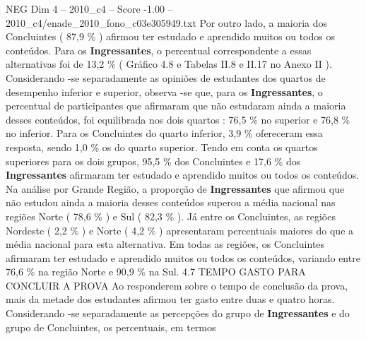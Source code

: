 \begin{textsample}{NEG Dim 4 – 2010\_c4 – Score -1.00 – 2010\_c4/enade\_2010\_fono\_c03e305949.txt}
Por outro lado, a maioria dos Concluintes ( 87,9 \% ) afirmou ter estudado e aprendido muitos ou todos os conteúdos.
Para os \textbf{Ingressantes}, o percentual correspondente a essas alternativas foi de 13,2 \% ( Gráfico 4.8 e Tabelas II.8 e II.17 no Anexo II ).
Considerando -se separadamente as opiniões de estudantes dos quartos de desempenho inferior e superior, observa -se que, para os \textbf{Ingressantes}, o percentual de participantes que afirmaram que não estudaram ainda a maioria desses conteúdos, foi equilibrada nos dois quartos : 76,5 \% no superior e 76,8 \% no inferior.
Para os Concluintes do quarto inferior, 3,9 \% ofereceram essa resposta, sendo 1,0 \% os do quarto superior.
Tendo em conta os quartos superiores para os dois grupos, 95,5 \% dos Concluintes e 17,6 \% dos \textbf{Ingressantes} afirmaram ter estudado e aprendido muitos ou todos os conteúdos.
Na análise por Grande Região, a proporção de \textbf{Ingressantes} que afirmou que não estudou ainda a maioria desses conteúdos superou a média nacional nas regiões Norte ( 78,6 \% ) e Sul ( 82,3 \% ).
Já entre os Concluintes, as regiões Nordeste ( 2,2 \% ) e Norte ( 4,2 \% ) apresentaram percentuais maiores do que a média nacional para esta alternativa.
Em todas as regiões, os Concluintes afirmaram ter estudado e aprendido muitos ou todos os conteúdos, variando entre 76,6 \% na região Norte e 90,9 \% na Sul. 4.7 TEMPO GASTO PARA CONCLUIR A PROVA Ao responderem sobre o tempo de conclusão da prova, mais da metade dos estudantes afirmou ter gasto entre duas e quatro horas.
Considerando -se separadamente as percepções do grupo de \textbf{Ingressantes} e do grupo de Concluintes, os percentuais, em termos

\end{textsample}

